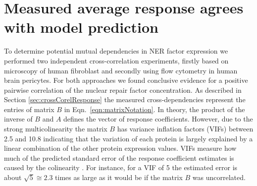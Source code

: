 \section{Measured average response agrees with model prediction}
To determine potential mutual dependencies in NER factor expression we performed two independent cross-correlation experiments, firstly based on microscopy of human fibroblast and secondly using flow cytometry in human brain pericytes. For both approaches we found conclusive evidence for a positive pairwise correlation of the nuclear repair factor concentration. As described in Section \ref{sec:crossCorelResponse} the measured cross-dependencies represent the entries of matrix $B$ in Eqn.\ \ref{eqn:matrixNotation}. In theory, the product of the inverse of $B$ and $A$ defines the vector of response coefficients. However, due to the strong multicolinearity the matrix $B$ has variance inflation factors (VIFs) between 2.5 and 10.8 indicating that the variation of each protein is largely explained by a linear combination of the other protein expression values. VIFs measure how much of the predicted standard error of the response coefficient estimates is caused by the colinearity \cite{Allison1999}. For instance, for a VIF of 5 the estimated error is  about $\sqrt{5} \cong 2.3$ times as large as it would be if the matrix $B$ was uncorrelated. 
